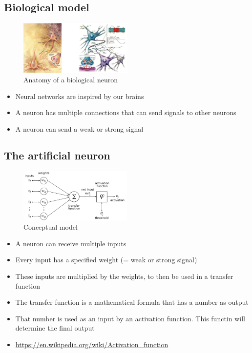 \documentclass{article}
\begin{document}
\subsection{Biological model}

\begin{figure}[H]
    \centering
    \includegraphics[width=0.5\textwidth]{biologisch-neuron.png}
    \caption{Anatomy of a biological neuron}
\end{figure}

\begin{itemize}
    \item Neural networks are inspired by our brains
    \item A neuron has multiple connections that can send signals to other neurons
    \item A neuron can send a weak or strong signal
\end{itemize}

\subsection{The artificial neuron}

\begin{figure}[H]
    \centering
    \includegraphics[width=0.5\textwidth]{neuron.png}
    \caption{Conceptual model}
\end{figure}

\begin{itemize}
    \item A neuron can receive multiple inputs
    \item Every input has a specified weight (= weak or strong signal)
    \item These inputs are multiplied by the weights, to then be used in a transfer function
    \item The transfer function is a mathematical formula that has a number as output
    \item That number is used as an input by an activation function. This functin will determine the final output
    \item \url{https://en.wikipedia.org/wiki/Activation_function}
\end{itemize}
\end{document}
